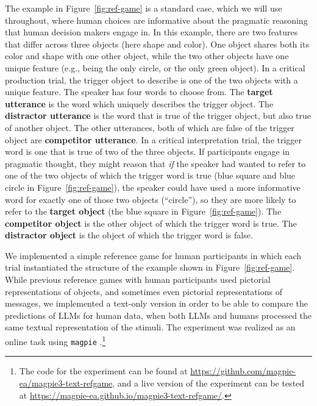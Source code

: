 \documentclass[fleqn]{article}
\begin{document}
The example in Figure~\ref{fig:ref-game} is a standard case, which we will use throughout, where human choices are informative about the pragmatic reasoning that human decision makers engage in.
In this example, there are two features that differ across three objects (here shape and color).
One object shares both its color and shape with one other object, while the two other objects have one unique feature (e.g., being the only circle, or the only green object).
%
In a critical production trial, the trigger object to describe is one of the two objects with a unique feature.
The speaker has four words to choose from.
The \textbf{target utterance} is the word which uniquely describes the trigger object.
The \textbf{distractor utterance} is the word that is true of the trigger object, but also true of another object.
The other utterances, both of which are false of the trigger object are \textbf{competitor utterance}.
%
In a critical interpretation trial, the trigger word is one that is true of two of the three objects.
If participants engage in pragmatic thought, they might reason that \emph{if} the speaker had wanted to refer to one of the two objects of which the trigger word is true (blue square and blue circle in Figure~\ref{fig:ref-game}), the speaker could have used a more informative word for exactly one of those two objects (``circle''), so they are more likely to refer to the \textbf{target object} (the blue square in Figure~\ref{fig:ref-game}).
The \textbf{competitor object} is the other object of which the trigger word is true.
The \textbf{distractor object} is the object of which the trigger word is false.

We implemented a simple reference game for human participants in which each trial instantiated the structure of the example shown in Figure~\ref{fig:ref-game}.
While previous reference games with human participants used pictorial representations of objects, and sometimes even pictorial representations of messages, we implemented a text-only version in order to be able to compare the predictions of LLMs for human data, when both LLMs and humans processed the same textual representation of the stimuli.
The experiment was realized as an online task using \texttt{magpie} \citep{FrankeJi:magpie:-Minimal}.\footnote{
  The code for the experiment can be found at \href{https://github.com/magpie-ea/magpie3-text-refgame}{https://github.com/magpie-ea/magpie3-text-refgame}, and a live version of the experiment can be tested at \href{https://magpie-ea.github.io/magpie3-text-refgame/}{https://magpie-ea.github.io/magpie3-text-refgame/}.
}
\end{document}
